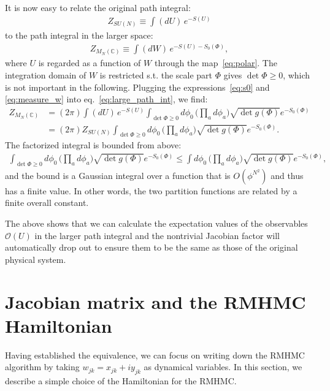 \documentclass[12pt]{article}
\begin{document}
It is now easy to relate the original path integral:
\begin{align}
  Z_{SU(N)}
  \equiv
  \int(dU)\,
  e^{-S(U)}
\end{align}
to the path integral in the larger space:
\begin{align}
  Z_{M_N(\mathbb{C})}
  \equiv
  \int (dW)\,
  e^{ - S(U)- S_0(\Phi)},
  \label{eq:large_path_int}
\end{align}
where $U$ is regarded as a function of $W$ through the map~\eqref{eq:polar}.
The integration domain of $W$
is restricted s.t.
the scale part $\Phi$ gives $\det \Phi \geq 0$,
which is not important in the following.
Plugging the expressions~\eqref{eq:s0} and \eqref{eq:measure_w}
into eq.~\eqref{eq:large_path_int}, we find:
\begin{align}
  Z_{M_N(\mathbb{C})}
  &=
    (2\pi)
    \int
    (dU)\, e^{-S(U)}
    \int_{\det \Phi \geq 0}
    d\phi_0
    \,
    \Big(\prod_a d\phi_a\Big)
    \sqrt{\det g(\Phi)}
    e^{-S_0(\Phi)}
    \nonumber \\
  &=
    (2\pi)
    Z_{SU(N)}
    \int_{\det \Phi \geq 0}
    d\phi_0
    \,
    \Big(\prod_a d\phi_a\Big)
    \sqrt{\det g(\Phi)}
    e^{-S_0(\Phi)}.
\end{align}
The factorized integral is bounded from above:
\begin{align}
  \int_{\det \Phi \geq 0}
  d\phi_0
  \,
  \Big(\prod_a d\phi_a\Big)
  \sqrt{\det g(\Phi)}
  e^{-S_0(\Phi)}
  \leq
  \int
  d\phi_0
  \,
  \Big(\prod_a d\phi_a\Big)
  \sqrt{\det g(\Phi)}
  e^{-S_0(\Phi)},
\end{align}
and the bound is a Gaussian integral
over a function that is $O(\phi^{N^2})$
and thus has a finite value.
In other words,
the two partition functions are related by
a finite overall constant.

The above shows that we can calculate the expectation values of
the observables ${\mathcal O}(U)$ in the larger path integral
and the nontrivial Jacobian factor will automatically drop out
to ensure them to be the same as those of the original physical system.



\section{Jacobian matrix and the RMHMC Hamiltonian}
\label{sec:rmhmc_hamil}

Having established the equivalence,
we can focus on writing down the
RMHMC algorithm by taking
$w_{jk}=x_{jk}+iy_{jk}$ as dynamical variables.
In this section, we describe a simple
choice of the Hamiltonian for the RMHMC.
\end{document}
